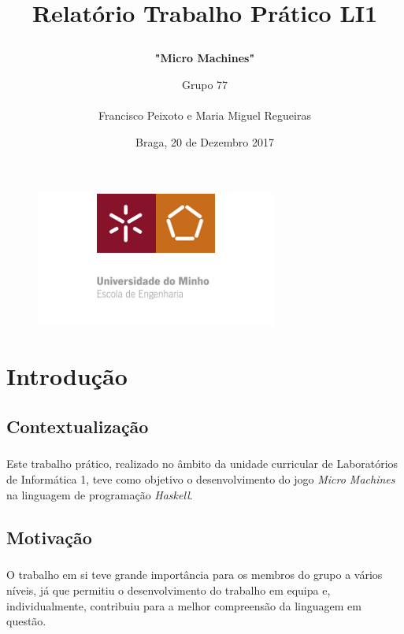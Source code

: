 \documentclass[12pt,a4paper]{report}
\begin{document}

\title{Relatório Trabalho Prático LI1 \paragraph{}\textbf{"Micro Machines"}}

\begin{figure}[t]
\includegraphics[scale=0.7]{ee-um.png}
\end{figure}

\author{Grupo 77\\
\\
Francisco Peixoto e Maria Miguel Regueiras}
\date{Braga, 20 de Dezembro 2017}
\maketitle
\tableofcontents
\listoffigures

\chapter{Introdução}

  \section{Contextualização}
  \paragraph{} Este trabalho prático, realizado no âmbito da unidade curricular de Laboratórios de Informática 1, teve como objetivo o desenvolvimento do jogo \textit{Micro Machines} na linguagem de programação \textit{Haskell}. 

  

  \section{Motivação}
  \paragraph{} O trabalho em si teve grande importância para os membros do grupo a vários níveis, já que permitiu o desenvolvimento do trabalho em equipa e, individualmente, contribuiu para a melhor compreensão da linguagem em questão.
  
\end{document}
